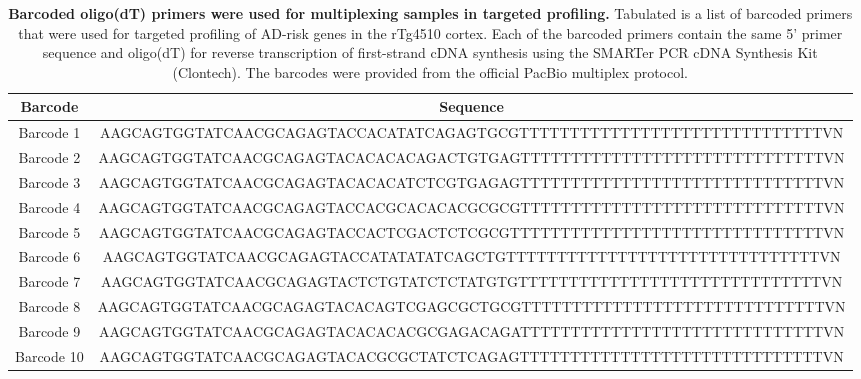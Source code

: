 \begin{landscape}
	\begin{table}[ht]
		\centering
		\captionsetup{width=1.5\textwidth}
		\caption[Barcoded oligo(dT) primers for targeted profiling]%
		{\textbf{Barcoded oligo(dT) primers were used for multiplexing samples in targeted profiling.} Tabulated is a list of barcoded primers that were used for targeted profiling of AD-risk genes in the rTg4510 cortex. Each of the barcoded primers contain the same 5' primer sequence and oligo(dT) for reverse transcription of first-strand cDNA synthesis using the SMARTer PCR cDNA Synthesis Kit (Clontech). The barcodes were provided from the official PacBio multiplex protocol.}
		\label{tab:barcode_primers}
		\vspace{1cm}
		\begin{tabularx}{1.5\textwidth}{cc}
			\toprule
			Barcode & Sequence                                                                  \\ \midrule
			Barcode 1    & AAGCAGTGGTATCAACGCAGAGTACCACATATCAGAGTGCGTTTTTTTTTTTTTTTTTTTTTTTTTTTTTTVN \\
			Barcode 2    & AAGCAGTGGTATCAACGCAGAGTACACACACAGACTGTGAGTTTTTTTTTTTTTTTTTTTTTTTTTTTTTTVN \\
			Barcode 3    & AAGCAGTGGTATCAACGCAGAGTACACACATCTCGTGAGAGTTTTTTTTTTTTTTTTTTTTTTTTTTTTTTVN \\
			Barcode 4    & AAGCAGTGGTATCAACGCAGAGTACCACGCACACACGCGCGTTTTTTTTTTTTTTTTTTTTTTTTTTTTTTVN \\
			Barcode 5    & AAGCAGTGGTATCAACGCAGAGTACCACTCGACTCTCGCGTTTTTTTTTTTTTTTTTTTTTTTTTTTTTTTVN \\
			Barcode 6    & AAGCAGTGGTATCAACGCAGAGTACCATATATATCAGCTGTTTTTTTTTTTTTTTTTTTTTTTTTTTTTTTVN \\
			Barcode 7    & AAGCAGTGGTATCAACGCAGAGTACTCTGTATCTCTATGTGTTTTTTTTTTTTTTTTTTTTTTTTTTTTTTVN \\
			Barcode 8    & AAGCAGTGGTATCAACGCAGAGTACACAGTCGAGCGCTGCGTTTTTTTTTTTTTTTTTTTTTTTTTTTTTTVN \\
			Barcode 9    & AAGCAGTGGTATCAACGCAGAGTACACACACGCGAGACAGATTTTTTTTTTTTTTTTTTTTTTTTTTTTTTVN \\
			Barcode 10 & AAGCAGTGGTATCAACGCAGAGTACACGCGCTATCTCAGAGTTTTTTTTTTTTTTTTTTTTTTTTTTTTTTVN \\ \bottomrule
		\end{tabularx}
	\end{table}
\end{landscape}


